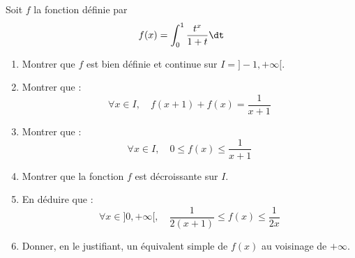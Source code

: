 \documentclass[a4paper,10pt]{report}
\begin{document}
\begin{Exa} Soit $f$ la fonction d\'efinie par 
$$f(x)=\int_0^1 \frac{t^x}{1+t} \dt$$
	\begin{enumerate}
	\item Montrer que $f$ est bien d\'efinie et continue sur $I=]-1, + \infty[$.

	\item Montrer que :
$$\forall x\in I,\quad f(x+1)+f(x)=\frac1{x+1}$$

	\item Montrer que :
$$\forall x\in I,\quad 0\leq f(x) \leq \frac1{x+1}$$

	\item Montrer que la fonction $f$ est d\'ecroissante sur $I$.

	\item En d\'eduire que :
$$\forall x\in]0,+\infty[,\quad \frac1{2(x+1)} \leq f(x) \leq \frac1{2x}$$

	\item Donner, en le justifiant, un \'equivalent simple de $f(x)$ au voisinage de $+\infty$.
	\end{enumerate}
\end{Exa}

\corr 
\end{document}
